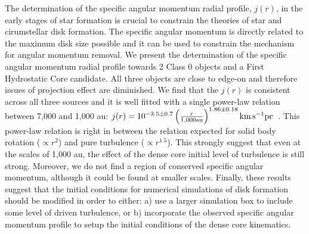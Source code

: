 The determination of the specific angular momentum radial profile, $j(r)$, in the early stages of star formation is crucial to constrain the theories of star and cirumstellar disk formation.
The specific angular momentum is directly related to the maximum disk size possible and 
it can be used to constrain the mechanism for angular momentum removal. 
We present the determination of the specific angular momentum radial profile towards 2 Class 0 objects and a First Hydrostatic Core candidate. 
All three objects are close to edge-on and therefore issues of projection effect are diminished. 
We find that the $j(r)$ is consistent across all three sources and it is well fitted with a single power-law relation between 7,000 and 1,000 au: 
$j(r) = 10^{-3.5\pm 0.7}\left( \frac{r}{1,000 \textrm{au}}\right)^{1.86\pm0.18} \rm{km\, s^{-1} pc}$~.
This power-law relation is right in between the relation expected for solid body rotation ($\propto r^2$) and pure turbulence ($\propto r^{1.5}$). 
This strongly suggest that even at the scales of 1,000 au, the effect of the dense core initial level of turbulence is still strong. 
Moreover, we do not find a region of conserved specific angular momentum, although it could be found at 
smaller scales. 
Finally, these results suggest that the initial conditions for numerical simulations of disk formation 
should be modified in order to either: 
a) use a larger simulation box to include some level of driven turbulence, or 
b) incorporate the observed specific angular momentum profile to setup the initial conditions of the dense core kinematics.